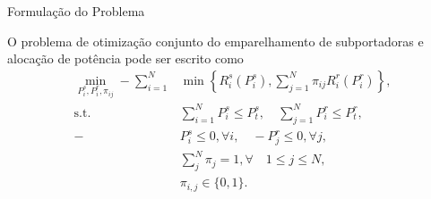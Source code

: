 \begin{frame}{Formulação do Problema}
   \begin{bigitem}
      \item O problema de otimização conjunto do emparelhamento de subportadoras e alocação de potência pode ser escrito como
      \begin{subequations}\label{eq:conj_pro}
              \begin{alignat}{3}
                      \min_{P_i^s,P_i^r,\pi_{ij}}-\sum_{i=1}^N &\min\left\{R_i^s(P_i^s),\sum_{j=1}^N\pi_{ij}R_i^r(P_i^r)\right\},\\
                      \text{s.t.} &\sum_{i=1}^N P_i^s \leq P_{t}^s, \quad \sum_{j=1}^N P_i^r \leq P_{t}^r,\\
                      -&P_i^s \leq 0, \forall i, \quad -P_j^r \leq 0, \forall j,\label{seq:restP} \\
                      & \sum_{j}^N \pi_{j} = 1, \forall \quad 1 \leq j \leq N,\label{seq:restEmpr}\\
                      &\pi_{i,j} \in \{0, 1\}.
              \end{alignat}
      \end{subequations}
   \end{bigitem}
\end{frame}




